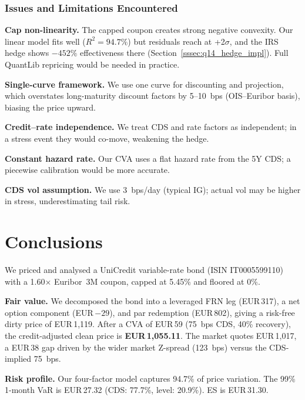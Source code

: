 \documentclass[11pt,a4paper]{article}
\begin{document}
\subsubsection{Issues and Limitations Encountered}
\label{sssec:limitations}

\noindent\textbf{Cap non-linearity.}\quad
The capped coupon creates strong negative convexity.
Our linear model fits well ($R^2=94.7\%$) but residuals
reach  at +2$\sigma$, and the IRS hedge shows
$-452\%$ effectiveness there
(Section~\ref{sssec:q14_hedge_impl}).  Full QuantLib
repricing would be needed in practice.

\noindent\textbf{Single-curve framework.}\quad
We use one curve for discounting and projection, which
overstates long-maturity discount factors by 5--10~bps
(OIS--Euribor basis), biasing the price upward.

\noindent\textbf{Credit--rate independence.}\quad
We treat CDS and rate factors as independent; in a
stress event they would co-move, weakening the hedge.

\noindent\textbf{Constant hazard rate.}\quad
Our CVA uses a flat hazard rate from the 5Y CDS;
a piecewise calibration would be more accurate.

\noindent\textbf{CDS vol assumption.}\quad
We use 3~bps/day (typical IG); actual vol may be higher
in stress, underestimating tail risk.

\section{Conclusions}

We priced and analysed a UniCredit variable-rate bond
(ISIN IT0005599110) with a 1.60$\times$ Euribor~3M coupon,
capped at 5.45\% and floored at 0\%.

\noindent\textbf{Fair value.}\quad
We decomposed the bond into a leveraged FRN leg (EUR\,317),
a net option component (EUR\,$-29$), and par redemption
(EUR\,802), giving a risk-free dirty price of EUR\,1,119.
After a CVA of EUR\,59 (75~bps CDS, 40\% recovery),
the credit-adjusted clean price is
\textbf{EUR\,1,055.11}.  The market quotes EUR\,1,017,
a EUR\,38 gap driven by the wider market Z-spread
(123~bps) versus the CDS-implied 75~bps.

\noindent\textbf{Risk profile.}\quad
Our four-factor model captures 94.7\% of price variation.
The 99\% 1-month VaR is EUR\,27.32 (CDS: 77.7\%,
level: 20.9\%).  ES is EUR\,31.30.
\end{document}
